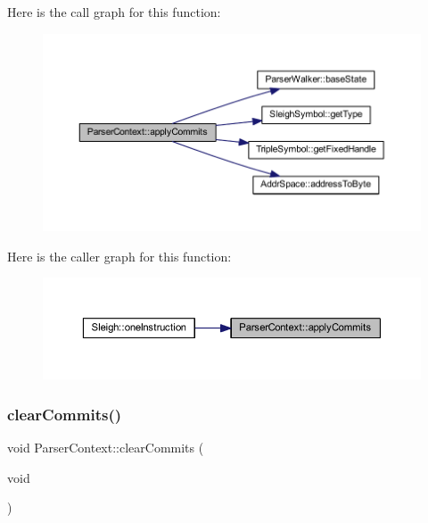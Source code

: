 Here is the call graph for this function\+:
\nopagebreak
\begin{figure}[H]
\begin{center}
\leavevmode
\includegraphics[width=350pt]{class_parser_context_aa08843c5d8fb8267069a83120b77bed5_cgraph}
\end{center}
\end{figure}
Here is the caller graph for this function\+:
\nopagebreak
\begin{figure}[H]
\begin{center}
\leavevmode
\includegraphics[width=350pt]{class_parser_context_aa08843c5d8fb8267069a83120b77bed5_icgraph}
\end{center}
\end{figure}
\mbox{\label{class_parser_context_ab1b9f2de6217feb73966e15ef89ab4f4}} 
\subsubsection{\texorpdfstring{clearCommits()}{clearCommits()}}
{\footnotesize\ttfamily void Parser\+Context\+::clear\+Commits (\begin{DoxyParamCaption}\item[{void}]{ }\end{DoxyParamCaption})\hspace{0.3cm}{\ttfamily [inline]}}



